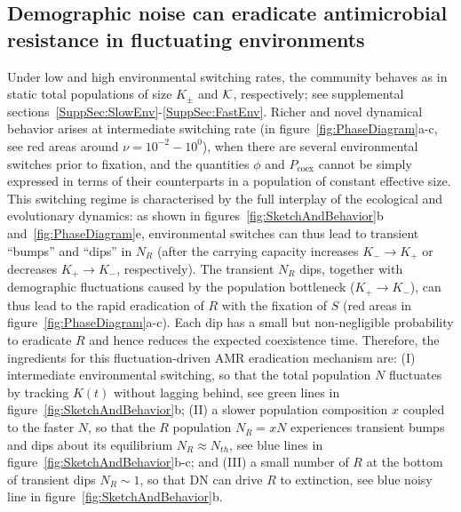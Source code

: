 \documentclass{article}
\begin{document}
\subsection{Demographic noise can eradicate antimicrobial resistance in fluctuating environments}
\label{Sec:TransientDips}
Under low and high environmental switching rates, the community behaves as in static total populations of size $K_{\pm}$ and ${\cal K}$, respectively; see supplemental sections~\ref{SuppSec:SlowEnv}-\ref{SuppSec:FastEnv}. Richer and novel dynamical behavior arises at intermediate switching rate (in figure~\ref{fig:PhaseDiagram}a-c, see red areas around \(\nu=10^{-2}-10^{0}\)), when there are several environmental switches prior to fixation, and the quantities $\phi$ and $P_{\text{coex}}$ cannot be simply expressed in terms of their counterparts in a population of constant effective size. This switching regime is characterised by the full interplay of the ecological and evolutionary dynamics: as shown in figures~\ref{fig:SketchAndBehavior}b and~\ref{fig:PhaseDiagram}e, environmental switches can thus lead to transient ``bumps'' and ``dips'' in $N_R$ (after the carrying capacity increases \(K_{-}\rightarrow K_{+}\) or decreases \(K_{+}\rightarrow K_{-}\), respectively). The transient $N_R$ dips, together with demographic fluctuations caused by the population bottleneck (\(K_+\rightarrow K_-\)), can thus lead to the rapid eradication of $R$ with the fixation of $S$ (red areas in figure~\ref{fig:PhaseDiagram}a-c). Each dip has a small but non-negligible probability to eradicate $R$ and hence reduces the expected coexistence time. Therefore, the ingredients for this fluctuation-driven AMR eradication mechanism are: (I) intermediate environmental switching, so that the total population \(N\) fluctuates by tracking \(K(t)\) without lagging behind, see green lines in figure~\ref{fig:SketchAndBehavior}b; (II) a slower population composition \(x\) coupled to the faster \(N\), so that the \(R\) population \(N_{R}=xN\) experiences transient bumps and dips about its equilibrium \(N_{R}\approx N_{th}\), see blue lines in figure~\ref{fig:SketchAndBehavior}b-c; and (III) a small number of \(R\) at the bottom of transient dips \(N_{R}\sim1\), so that DN can drive \(R\) to extinction, see blue noisy line in figure~\ref{fig:SketchAndBehavior}b.
\end{document}
